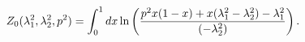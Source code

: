 \begin{equation}
Z_{0}(\lambda _{1}^{2},\lambda _{2}^{2},p^{2})=\int_{0}^{1}dx\ln \left( 
\frac{p^{2}x(1-x)+x(\lambda _{1}^{2}-\lambda _{2}^{2})-\lambda _{1}^{2}}{%
(-\lambda _{2}^{2})}\right) .
\end{equation}

